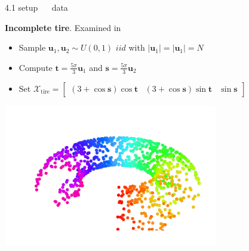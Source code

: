 \documentclass[11pt, compress, t, notes = noshow, xcolor = table, 
aspectratio = 1610]{beamer}
\newcommand{\highlight}[1]{\textcolor{highlightcol}{\textbf{#1}}}
\newcommand{\flexitem}[1]{\item[$\highlight{#1}$]}
\newcommand{\X}{\mathcal{X}}
\begin{document}
\begin{frame}{\textcolor{gray!90}{4.1 setup} ~~ data}
\begin{minipage}[b]{0.65\textwidth}
  \textbf{Incomplete tire}. Examined in \citet{yangetal2006}
  \begin{itemize}
    \flexitem{1} Sample $\bm{u}_1, \bm{u}_2 \sim U(0, 1)$ 
    $\mathit{ iid}$ with $\rvert \bm{u}_1 \rvert = \rvert \bm{u}_1 \rvert = N$
    \flexitem{2} Compute $\bm{t} = \frac{5 \pi}{3} \bm{u}_1$ and 
    $\bm{s} = \frac{5 \pi}{3} \bm{u}_2$
    \flexitem{3} Set $\X_{\text{tire}} = 
    \begin{bmatrix} (3 + \cos{\bm{s}}) \cos{\bm{t}} & 
    (3 + \cos{\bm{s}}) \sin{\bm{t}} & \sin{\bm{s}} \end{bmatrix}$ 
  \end{itemize}
\end{minipage}%
\begin{minipage}[b]{0.35\textwidth}
  \centering
  \includegraphics[trim = 20 0 0 0, clip, %
    width = 0.7\textwidth]{figures/incomplete-tire}
\end{minipage}

\end{frame}

\end{document}
